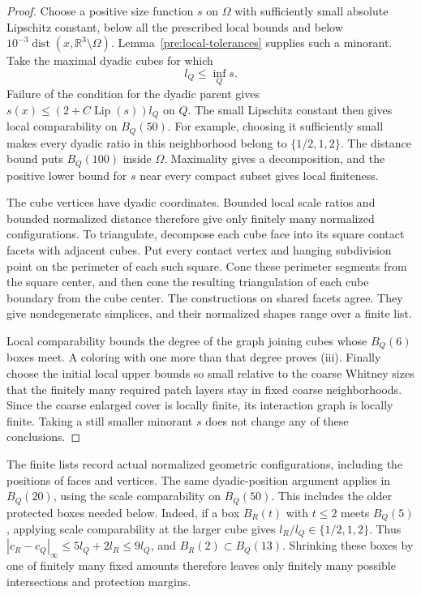 \documentclass[11pt]{article}
\numberwithin{equation}{section}
\theoremstyle{definition}
\theoremstyle{remark}
\begin{document}
\begin{proof}
Choose a positive size function $s$ on $\Omega$ with sufficiently
small absolute Lipschitz constant, below all the prescribed local
bounds and below $10^{-3}\operatorname{dist}(x,\mathbb R^3\setminus\Omega)$.
Lemma~\ref{pre:local-tolerances} supplies such a minorant.  Take the
maximal dyadic cubes for which
\[
 l_Q\le\inf_Qs.
\]
Failure of the condition for the dyadic parent gives
$s(x)\le(2+C\operatorname{Lip}(s))l_Q$ on $Q$.  The small Lipschitz constant
then gives local comparability on $B_Q(50)$.  For example, choosing
it sufficiently small makes every dyadic ratio in this neighborhood
belong to $\{1/2,1,2\}$.  The distance bound puts $B_Q(100)$ inside
$\Omega$.  Maximality gives a decomposition, and the positive lower
bound for $s$ near every compact subset gives local finiteness.

The cube vertices have dyadic coordinates.  Bounded local scale
ratios and bounded normalized distance therefore give only finitely
many normalized configurations.  To triangulate, decompose each
cube face into its square contact facets with adjacent cubes.
Put every contact vertex and hanging subdivision point on the
perimeter of each such square.  Cone these perimeter segments from
the square center, and then cone the resulting triangulation of
each cube boundary from the cube center.  The constructions on
shared facets agree.  They give nondegenerate simplices, and their
normalized shapes range over a finite list.

Local comparability bounds the degree of the graph joining cubes
whose $B_Q(6)$ boxes meet.  A coloring with one more than that
degree proves \textup{(iii)}.  Finally choose the initial local
upper bounds so small relative to the coarse Whitney sizes that
the finitely many required patch layers stay in fixed coarse
neighborhoods.  Since the coarse enlarged cover is locally finite,
its interaction graph is locally finite.  Taking a still smaller
minorant $s$ does not change any of these conclusions.
\end{proof}

The finite lists record actual normalized geometric configurations,
including the positions of faces and vertices.  The same
dyadic-position argument applies in $B_Q(20)$, using the scale
comparability on $B_Q(50)$.  This includes the older protected
boxes needed below.  Indeed, if a box $B_R(t)$ with $t\le2$ meets
$B_Q(5)$, applying scale comparability at the larger cube gives
$l_R/l_Q\in\{1/2,1,2\}$.  Thus
$|c_R-c_Q|_\infty\le5l_Q+2l_R\le9l_Q$, and
$B_R(2)\subset B_Q(13)$.  Shrinking these boxes by one of
finitely many fixed amounts therefore leaves only finitely many
possible intersections and protection margins.
\end{document}

